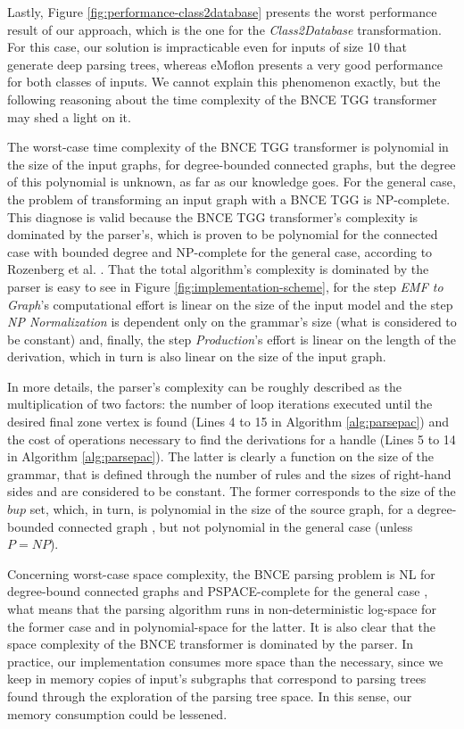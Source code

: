 Lastly, Figure \ref{fig:performance-class2database} presents the worst performance result of our approach, which is the one for the \emph{Class2Database} transformation. For this case, our solution is impracticable even for inputs of size 10 that generate deep parsing trees, whereas eMoflon presents a very good performance for both classes of inputs. We cannot explain this phenomenon exactly, but the following reasoning about the time complexity of the BNCE TGG transformer may shed a light on it.

The worst-case time complexity of the BNCE TGG transformer is polynomial in the size of the input graphs, for degree-bounded connected graphs, but the degree of this polynomial is unknown, as far as our knowledge goes. For the general case, the problem of transforming an input graph with a BNCE TGG is NP-complete. This diagnose is valid because the BNCE TGG transformer's complexity is dominated by the parser's, which is proven to be polynomial for the connected case with bounded degree and NP-complete for the general case, according to Rozenberg et al. \cite[p. 160]{rozenberg1986boundary}. That the total algorithm's complexity is dominated by the parser is easy to see in Figure \ref{fig:implementation-scheme}, for the step \emph{EMF to Graph}'s computational effort is linear on the size of the input model and the step \emph{NP Normalization} is dependent only on the grammar's size (what is considered to be constant) and, finally, the step \emph{Production}'s effort is linear on the length of the derivation, which in turn is also linear on the size of the input graph.

In more details, the parser's complexity can be roughly described as the multiplication of two factors: the number of loop iterations executed until the desired final zone vertex is found (Lines 4 to 15 in Algorithm \ref{alg:parsepac}) and the cost of operations necessary to find the derivations for a handle (Lines 5 to 14 in Algorithm \ref{alg:parsepac}). The latter is clearly a function on the size of the grammar, that is defined through the number of rules and the sizes of right-hand sides and are considered to be constant. The former corresponds to the size of the $bup$ set, which, in turn, is polynomial in the size of the source graph, for a degree-bounded connected graph \cite[p. 161]{rozenberg1986boundary}, but not polynomial in the general case (unless $P=NP$).

Concerning worst-case space complexity, the BNCE parsing problem is NL for degree-bound connected graphs \cite{kim2001efficient} and PSPACE-complete for the general case \cite{rozenberg1986boundary}, what means that the parsing algorithm runs in non-deterministic log-space for the former case and in polynomial-space for the latter. It is also clear that the space complexity of the BNCE transformer is dominated by the parser. In practice, our implementation consumes more space than the necessary, since we keep in memory copies of input's subgraphs that correspond to parsing trees found through the exploration of the parsing tree space. In this sense, our memory consumption could be lessened.

